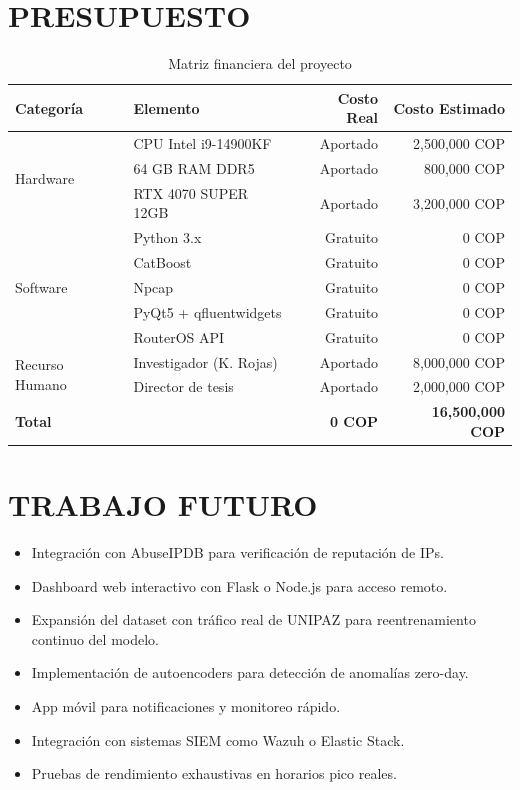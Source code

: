 \documentclass[12pt,letterpaper]{report}
\begin{document}
\chapter{PRESUPUESTO}

\begin{table}[H]
  \centering
  \caption{Matriz financiera del proyecto}
  \label{tab:presupuesto}
  \begin{tabularx}{\textwidth}{lXrr}
    \toprule
    \textbf{Categoría} & \textbf{Elemento} & \textbf{Costo Real} & \textbf{Costo Estimado} \\
    \midrule
    \multirow{3}{*}{Hardware} & CPU Intel i9-14900KF & Aportado & 2,500,000 COP \\
    & 64 GB RAM DDR5 & Aportado & 800,000 COP \\
    & RTX 4070 SUPER 12GB & Aportado & 3,200,000 COP \\
    \midrule
    \multirow{5}{*}{Software} & Python 3.x & Gratuito & 0 COP \\
    & CatBoost & Gratuito & 0 COP \\
    & Npcap & Gratuito & 0 COP \\
    & PyQt5 + qfluentwidgets & Gratuito & 0 COP \\
    & RouterOS API & Gratuito & 0 COP \\
    \midrule
    \multirow{2}{*}{Recurso Humano} & Investigador (K. Rojas) & Aportado & 8,000,000 COP \\
    & Director de tesis & Aportado & 2,000,000 COP \\
    \midrule
    \textbf{Total} & & \textbf{0 COP} & \textbf{16,500,000 COP} \\
    \bottomrule
  \end{tabularx}
\end{table}

\chapter{TRABAJO FUTURO}

\begin{itemize}
  \item Integración con AbuseIPDB para verificación de reputación de IPs.
  \item Dashboard web interactivo con Flask o Node.js para acceso remoto.
  \item Expansión del dataset con tráfico real de UNIPAZ para reentrenamiento continuo del modelo.
  \item Implementación de autoencoders para detección de anomalías zero-day.
  \item App móvil para notificaciones y monitoreo rápido.
  \item Integración con sistemas SIEM como Wazuh o Elastic Stack.
  \item Pruebas de rendimiento exhaustivas en horarios pico reales.
\end{itemize}
\end{document}
